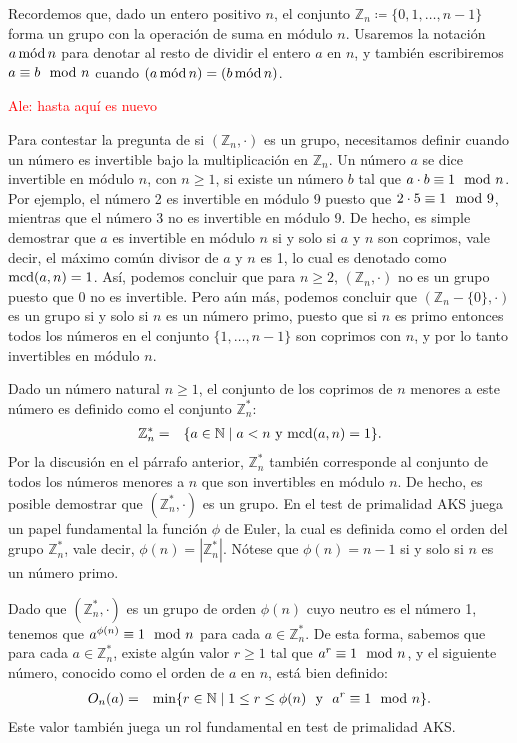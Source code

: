 Recordemos que, dado un entero positivo $n$, el conjunto $\mathbb{Z}_n \coloneq \{0, 1, \dots, n-1\}$ forma un grupo con la operación de suma en módulo $n$. Usaremos la notación $a \mods n$ para denotar al resto de dividir el entero $a$ en $n$, y también escribiremos $a \equiv b \modl n$ cuando $(a \mods n) = (b \mods n)$.


\textcolor{red}{Ale: hasta aquí es nuevo}


Para contestar la pregunta de si $(\mathbb{Z}_n, \cdot)$ es un grupo,
necesitamos definir cuando un número es invertible bajo la
multiplicación en $\mathbb{Z}_n$.  Un número $a$ se dice invertible en
módulo $n$, con $n \geq 1$, si existe un número $b$ tal que $a \cdot b
\equiv 1 \modl n$. Por ejemplo, el número 2 es invertible en módulo 9
puesto que $2 \cdot 5 \equiv 1 \modl 9$, mientras que el número 3 no
es invertible en módulo 9. De hecho, es simple demostrar que $a$ es
invertible en módulo $n$ si y solo si $a$ y $n$ son coprimos, vale
decir, el máximo común divisor de $a$ y $n$ es 1, lo cual es denotado
como $\MCD(a,n) = 1$.  Así, podemos concluir que para $n \geq 2$,
$(\mathbb{Z}_n, \cdot)$ no es un grupo puesto que $0$ no es
invertible. Pero aún más, podemos concluir que $(\mathbb{Z}_n - \{0\},
\cdot)$ es un grupo si y solo si $n$ es un número primo, puesto que si
$n$ es primo entonces todos los números en el conjunto $\{1, \ldots,
n-1\}$ son coprimos con $n$, y por lo tanto invertibles en módulo $n$.

Dado un número natural $n \geq 1$, el conjunto de los coprimos de $n$
menores a este número es definido como el conjunto
$\mathbb{Z}_n^*$:
\begin{eqnarray} \label{eq-zn-star}
  \mathbb{Z}_n^* & = & \{ a \in \mathbb{N} \mid a < n \text{ y }
  \MCD(a,n) = 1\}.
\end{eqnarray}
Por la discusión en el párrafo anterior, $\mathbb{Z}_n^*$ también
corresponde al conjunto de todos los números menores a $n$ que
son invertibles en módulo $n$. De hecho, es posible demostrar que
$(\mathbb{Z}_n^*, \cdot)$ es un grupo. En el test de primalidad AKS
juega un papel fundamental la función $\phi$ de Euler, la cual es
definida como el orden del grupo $\mathbb{Z}_n^*$, vale decir,
$\phi(n) = |\mathbb{Z}_n^*|$. Nótese que $\phi(n) = n -1$ si y solo si
$n$ es un número primo.

Dado que $(\mathbb{Z}_n^*, \cdot)$ es un grupo de orden $\phi(n)$ cuyo
neutro es el número 1, tenemos que $a^{\phi(n)} \equiv 1 \modl n$ para
cada $a \in \mathbb{Z}_n^*$. De esta forma, sabemos que para cada $a
\in \mathbb{Z}_n^*$, existe algún valor $r \geq 1$ tal que $a^r \equiv
1 \modl n$, y el siguiente número, conocido como el orden de $a$ en
$n$, está bien definido:
\begin{eqnarray*}
  O_n(a) & = & \min \{ r \in \mathbb{N} \mid 1 \leq r \leq \phi(n)
  \ \text{ y } \ a^r \equiv 1 \modl n \}.
\end{eqnarray*}
Este valor también juega un rol fundamental en test de primalidad AKS.


